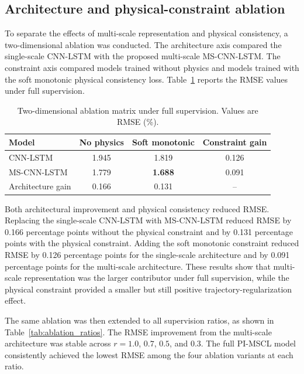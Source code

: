 \documentclass[a4paper,fleqn]{cas-dc}
\begin{document}
\subsection{Architecture and physical-constraint ablation}
\label{subsec:ablation_results}

To separate the effects of multi-scale representation and physical consistency, a two-dimensional ablation was conducted. The architecture axis compared the single-scale CNN-LSTM with the proposed multi-scale MS-CNN-LSTM. The constraint axis compared models trained without physics and models trained with the soft monotonic physical consistency loss. Table~\ref{tab:ablation_matrix_full} reports the RMSE values under full supervision.

\begin{table}[t]
\caption{Two-dimensional ablation matrix under full supervision. Values are RMSE (\%).}
\label{tab:ablation_matrix_full}
\centering
\begin{tabular}{lccc}
\toprule
Model & No physics & Soft monotonic & Constraint gain \\
\midrule
CNN-LSTM & 1.945 & 1.819 & 0.126 \\
MS-CNN-LSTM & 1.779 & \textbf{1.688} & 0.091 \\
Architecture gain & 0.166 & 0.131 & -- \\
\bottomrule
\end{tabular}
\end{table}

Both architectural improvement and physical consistency reduced RMSE. Replacing the single-scale CNN-LSTM with MS-CNN-LSTM reduced RMSE by 0.166 percentage points without the physical constraint and by 0.131 percentage points with the physical constraint. Adding the soft monotonic constraint reduced RMSE by 0.126 percentage points for the single-scale architecture and by 0.091 percentage points for the multi-scale architecture. These results show that multi-scale representation was the larger contributor under full supervision, while the physical constraint provided a smaller but still positive trajectory-regularization effect.

The same ablation was then extended to all supervision ratios, as shown in Table~\ref{tab:ablation_ratios}. The RMSE improvement from the multi-scale architecture was stable across $r=1.0$, $0.7$, $0.5$, and $0.3$. The full PI-MSCL model consistently achieved the lowest RMSE among the four ablation variants at each ratio.
\end{document}
